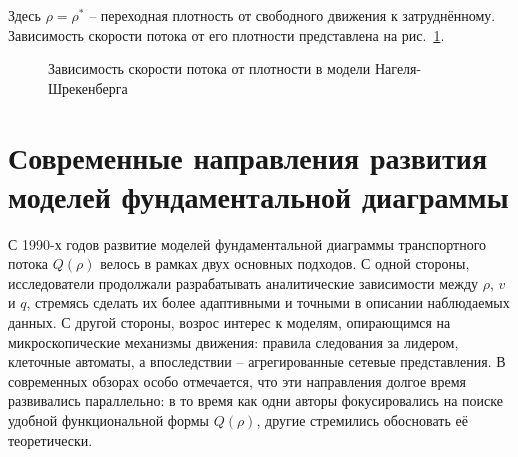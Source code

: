 \documentclass[12pt,a4paper]{article}
\begin{document}
Здесь \(\rho=\rho^*\) -- переходная плотность от свободного движения к затруднённому. Зависимость скорости потока от его плотности представлена на рис.~\ref{fig:nagel_vrho}.

\begin{figure}[ht!]
\begin{center}
\caption{Зависимость скорости потока от плотности в модели Нагеля-Шрекенберга}
\label{fig:nagel_vrho}
\end{center}
\end{figure}

\section{Современные направления развития моделей фундаментальной диаграммы}
С 1990-х годов развитие моделей фундаментальной диаграммы транспортного потока $Q(\rho)$ велось в рамках двух основных подходов. С одной стороны, исследователи продолжали разрабатывать аналитические зависимости между $\rho$, $v$ и $q$, стремясь сделать их более адаптивными и точными в описании наблюдаемых данных. С другой стороны, возрос интерес к моделям, опирающимся на микроскопические механизмы движения: правила следования за лидером, клеточные автоматы, а впоследствии -- агрегированные сетевые представления. В современных обзорах особо отмечается, что эти направления долгое время развивались параллельно: в то время как одни авторы фокусировались на поиске удобной функциональной формы $Q(\rho)$, другие стремились обосновать её теоретически.
\end{document}
